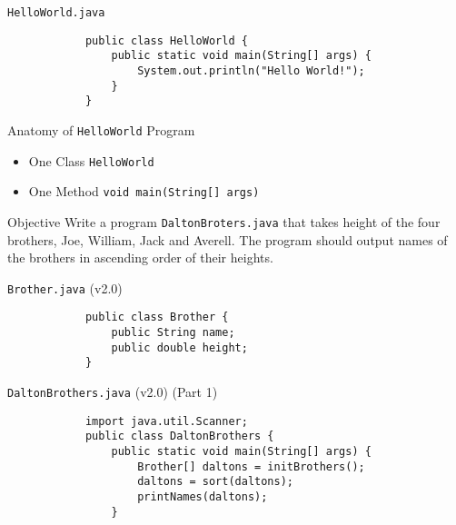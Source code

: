 \documentclass[10pt, compress]{beamer}
\begin{document}
\begin{slide}
	\begin{block}{\texttt{HelloWorld.java}}
		\begin{verbatim}
			public class HelloWorld {
			    public static void main(String[] args) {
			        System.out.println("Hello World!");
			    }
			}
		\end{verbatim}
	\end{block}
	\begin{block}{Anatomy of \texttt{HelloWorld} Program}
		\begin{itemize}
			\item[] One Class \texttt{HelloWorld}
			\item[] One Method \texttt{void main(String[] args)}
		\end{itemize}
	\end{block}
\end{slide}

\begin{slide}
	\begin{block}{Objective}
		Write a program \texttt{DaltonBroters.java} that takes height of the four brothers, Joe, William, Jack and Averell.
		The program should output names of the brothers in ascending order of their heights.
	\end{block}
\end{slide}

\begin{slide}
	\begin{block}{\texttt{Brother.java} (v2.0)}
		\begin{verbatim}
			public class Brother {
			    public String name;
			    public double height;
			}
		\end{verbatim}
	\end{block}
\end{slide}

\begin{slide}
	\begin{block}{\texttt{DaltonBrothers.java} (v2.0) (Part 1)}
		\begin{verbatim}
			import java.util.Scanner;
			public class DaltonBrothers {
			    public static void main(String[] args) {
			        Brother[] daltons = initBrothers();
			        daltons = sort(daltons);
			        printNames(daltons);
			    }
		\end{verbatim}
	\end{block}
\end{slide}
\end{document}
